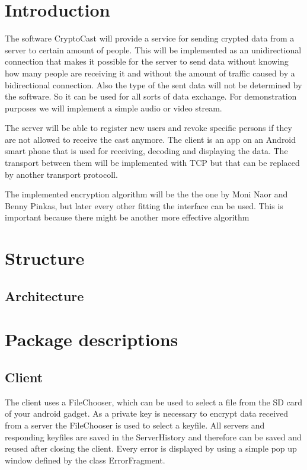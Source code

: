 \documentclass[a4paper,10pt]{scrartcl}
\title{\doctitle}
\author{\authorName}
\date{\today}
\begin{document}

\tableofcontents
\clearpage

\section{Introduction}
The software CryptoCast will provide a service for sending crypted data from a server to certain
amount of people.  This will be implemented as an unidirectional connection that makes it possible for the server
to send data without knowing how many people are receiving it and without the amount of traffic caused
by a bidirectional connection.  Also the type of the sent data will not be determined by the software. So it can be
used for all sorts of data exchange. For demonstration purposes we will implement a simple audio or video stream.

The server will be able to register new users and revoke specific persons if they are not allowed to receive the cast anymore. 
The client is an app on an Android smart phone that is used for receiving, decoding and displaying the data. 
The transport between them will be implemented with TCP but that can be replaced by another transport protocoll.

The implemented encryption algorithm will be the the one by Moni Naor and Benny Pinkas, but later every other fitting the
interface can be used. This is important because there might be another more effective algorithm 


\section{Structure}
\subsection{Architecture}


\section{Package descriptions}
\subsection{Client}
The client uses a FileChooser, which can be used to select a file from the SD card of your android gadget.
As a private key is necessary to encrypt data received from a server the FileChooser is used to select a keyfile.
All servers and responding keyfiles are saved in the ServerHistory and therefore can be saved and reused after closing the client.
Every error is displayed by using a simple pop up window defined by the class ErrorFragment.
\end{document}
